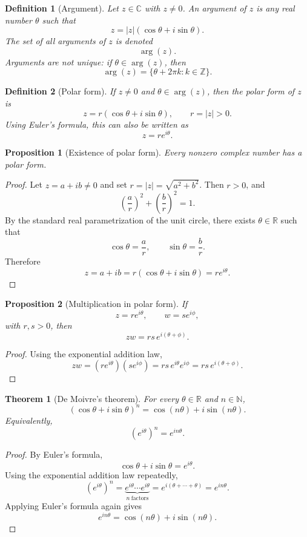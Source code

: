 \documentclass[11pt]{article}
\newtheorem{definition}{Definition}[section]
\newtheorem{proposition}{Proposition}[section]
\newtheorem{theorem}{Theorem}[section]
\newcommand{\C}{\mathbb{C}}
\newcommand{\R}{\mathbb{R}}
\newcommand{\N}{\mathbb{N}}
\newcommand{\Z}{\mathbb{Z}}
\newcommand{\abs}[1]{\left|#1\right|}
\begin{document}
\begin{definition}[Argument]
Let $z\in\C$ with $z\ne0$.
An argument of $z$ is any real number $\theta$ such that
\[
  z=\abs{z}(\cos\theta+i\sin\theta).
\]
The set of all arguments of $z$ is denoted
\[
  \arg(z).
\]
Arguments are not unique: if $\theta\in\arg(z)$, then
\[
  \arg(z)=\{\theta+2\pi k:k\in\Z\}.
\]
\end{definition}

\begin{definition}[Polar form]
If $z\ne0$ and $\theta\in\arg(z)$, then the polar form of $z$ is
\[
  z=r(\cos\theta+i\sin\theta),
  \qquad
  r=\abs{z}>0.
\]
Using Euler's formula, this can also be written as
\[
  z=re^{i\theta}.
\]
\end{definition}

\begin{proposition}[Existence of polar form]
Every nonzero complex number has a polar form.
\end{proposition}

\begin{proof}
Let $z=a+ib\ne0$ and set $r=\abs{z}=\sqrt{a^{2}+b^{2}}$.
Then $r>0$, and
\[
  \left(\frac{a}{r}\right)^{2}+\left(\frac{b}{r}\right)^{2}=1.
\]
By the standard real parametrization of the unit circle, there exists $\theta\in\R$ such that
\[
  \cos\theta=\frac{a}{r},
  \qquad
  \sin\theta=\frac{b}{r}.
\]
Therefore
\[
  z=a+ib=r(\cos\theta+i\sin\theta)=re^{i\theta}.
\]
\end{proof}

\begin{proposition}[Multiplication in polar form]
If
\[
  z=re^{i\theta},
  \qquad
  w=se^{i\phi},
\]
with $r,s>0$, then
\[
  zw=rs\,e^{i(\theta+\phi)}.
\]
\end{proposition}

\begin{proof}
Using the exponential addition law,
\[
  zw=(re^{i\theta})(se^{i\phi})=rs\,e^{i\theta}e^{i\phi}=rs\,e^{i(\theta+\phi)}.
\]
\end{proof}

\begin{theorem}[De Moivre's theorem]
For every $\theta\in\R$ and $n\in\N$,
\[
  (\cos\theta+i\sin\theta)^{n}
  =
  \cos(n\theta)+i\sin(n\theta).
\]
Equivalently,
\[
  (e^{i\theta})^{n}=e^{in\theta}.
\]
\end{theorem}

\begin{proof}
By Euler's formula,
\[
  \cos\theta+i\sin\theta=e^{i\theta}.
\]
Using the exponential addition law repeatedly,
\[
  (e^{i\theta})^{n}
  =
  \underbrace{e^{i\theta}\cdots e^{i\theta}}_{n\ \text{factors}}
  =
  e^{i(\theta+\cdots+\theta)}
  =
  e^{in\theta}.
\]
Applying Euler's formula again gives
\[
  e^{in\theta}=\cos(n\theta)+i\sin(n\theta).
\]
\end{proof}
\end{document}
